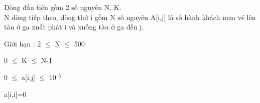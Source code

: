 Dòng đầu tiên gồm 2 số nguyên N, K.   
\\   N dòng tiếp theo, dòng thứ i gồm N số nguyên A[i,j] là số hành khách mua vé lên tàu ở ga xuất phát i và xuống tàu ở ga đến j.  

\emph{}    Giới hạn :      2  $\le$  N  $\le$  500  

   0  $\le$  K  $\le$  N-1  

   0  $\le$  a[i,j]  $\le$  10   $^    5   $

   a[i,i]=0  

\